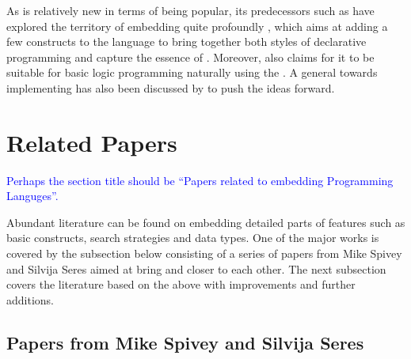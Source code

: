 \documentclass[thesis-solanki.tex]{subfiles}
\begin{document}
As  is relatively new in terms of being popular, its predecessors such as  have
explored the territory of embedding  quite profoundly \cite{friedman05reasoned}, which aims at adding a few
constructs to the language to bring together both styles of declarative programming and capture the essence of
.
Moreover,  also claims for it to be suitable for basic logic programming naturally using the
 \cite{website:logicprogexamplehaskell}.
A general  towards implementing  has also been discussed by
\cite{krishnamurthi2007programming} to push the ideas forward.

\section{Related Papers}
\textcolor{blue}{Perhaps the section title should be ``Papers related to embedding Programming Languges''.}

Abundant literature can be found on embedding detailed parts of  features such as basic
constructs, search strategies and data types.
One of the major works is covered by the subsection below consisting of a series of papers from Mike Spivey and
Silvija Seres aimed at bring  and  closer to each other.
The next subsection covers the literature based on the above
with improvements and further additions.


\subsection{Papers from Mike Spivey and Silvija Seres}
\end{document}
